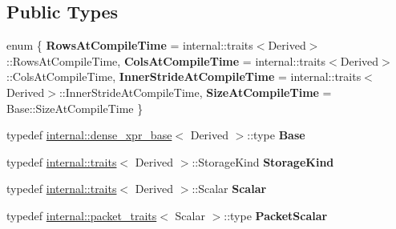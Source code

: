 \subsection*{Public Types}
\begin{DoxyCompactItemize}
\item 
\mbox{\label{class_eigen_1_1_map_base_3_01_derived_00_01_read_only_accessors_01_4_a1492bb3651442ab7c803886b1e814188}} 
enum \{ {\bfseries Rows\+At\+Compile\+Time} = internal\+::traits$<$Derived$>$\+::Rows\+At\+Compile\+Time, 
{\bfseries Cols\+At\+Compile\+Time} = internal\+::traits$<$Derived$>$\+::Cols\+At\+Compile\+Time, 
{\bfseries Inner\+Stride\+At\+Compile\+Time} = internal\+::traits$<$Derived$>$\+::Inner\+Stride\+At\+Compile\+Time, 
{\bfseries Size\+At\+Compile\+Time} = Base\+::Size\+At\+Compile\+Time
 \}
\item 
\mbox{\label{class_eigen_1_1_map_base_3_01_derived_00_01_read_only_accessors_01_4_a2166493966c7516ad2b8d5dac152cc61}} 
typedef \mbox{\hyperlink{struct_eigen_1_1internal_1_1dense__xpr__base}{internal\+::dense\+\_\+xpr\+\_\+base}}$<$ Derived $>$\+::type {\bfseries Base}
\item 
\mbox{\label{class_eigen_1_1_map_base_3_01_derived_00_01_read_only_accessors_01_4_af5f55877fa6b63dec975d994bb057796}} 
typedef \mbox{\hyperlink{struct_eigen_1_1internal_1_1traits}{internal\+::traits}}$<$ Derived $>$\+::Storage\+Kind {\bfseries Storage\+Kind}
\item 
\mbox{\label{class_eigen_1_1_map_base_3_01_derived_00_01_read_only_accessors_01_4_abe44c0f927ddaf98ee7a69ac2dd34ea6}} 
typedef \mbox{\hyperlink{struct_eigen_1_1internal_1_1traits}{internal\+::traits}}$<$ Derived $>$\+::Scalar {\bfseries Scalar}
\item 
\mbox{\label{class_eigen_1_1_map_base_3_01_derived_00_01_read_only_accessors_01_4_a364a4ac68dbf6626b45f5d8b49f2b6ff}} 
typedef \mbox{\hyperlink{struct_eigen_1_1internal_1_1packet__traits}{internal\+::packet\+\_\+traits}}$<$ Scalar $>$\+::type {\bfseries Packet\+Scalar}

\end{DoxyCompactItemize}
